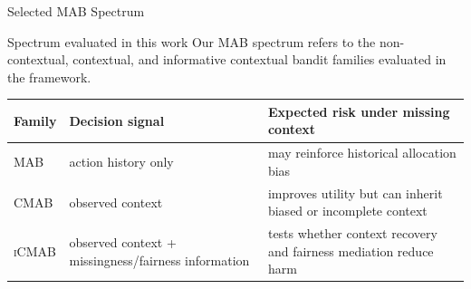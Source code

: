\documentclass[aspectratio=169,10pt]{beamer}
\newcommand{\mab}{\textsc{MAB}}
\newcommand{\cmab}{\textsc{CMAB}}
\newcommand{\icmab}{\textsc{iCMAB}}
\begin{document}
\begin{frame}{Selected MAB Spectrum}
\begin{block}{Spectrum evaluated in this work}
Our MAB spectrum refers to the non-contextual, contextual, and informative contextual bandit families evaluated in the framework.
\end{block}

\vspace{0.5em}
\begin{center}
\begin{tabular}{p{}p{}p{}}
\toprule
Family & Decision signal & Expected risk under missing context \\
\midrule
\mab & action history only & may reinforce historical allocation bias \\
\cmab & observed context & improves utility but can inherit biased or incomplete context \\
\icmab & observed context + missingness/fairness information & tests whether context recovery and fairness mediation reduce harm \\
\bottomrule
\end{tabular}
\end{center}
\end{frame}
\end{document}
